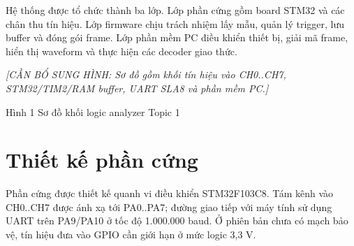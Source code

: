 Hệ thống được tổ chức thành ba lớp. Lớp phần cứng gồm board STM32 và các chân thu tín hiệu. Lớp firmware chịu trách nhiệm lấy mẫu, quản lý trigger, lưu buffer và đóng gói frame. Lớp phần mềm PC điều khiển thiết bị, giải mã frame, hiển thị waveform và thực hiện các decoder giao thức.

\emph{{[}CẦN BỔ SUNG HÌNH: Sơ đồ gồm khối tín hiệu vào CH0..CH7, STM32/TIM2/RAM buffer, UART SLA8 và phần mềm PC.{]}}

\protect{}\label{_Toc234276623}{}Hình 1 Sơ đồ khối logic analyzer Topic 1

\section{Thiết kế phần cứng}\label{thiux1ebft-kux1ebf-phux1ea7n-cux1ee9ng}

Phần cứng được thiết kế quanh vi điều khiển STM32F103C8. Tám kênh vào CH0..CH7 được ánh xạ tới PA0..PA7; đường giao tiếp với máy tính sử dụng UART trên PA9/PA10 ở tốc độ 1.000.000 baud. Ở phiên bản chưa có mạch bảo vệ, tín hiệu đưa vào GPIO cần giới hạn ở mức logic 3,3 V.

